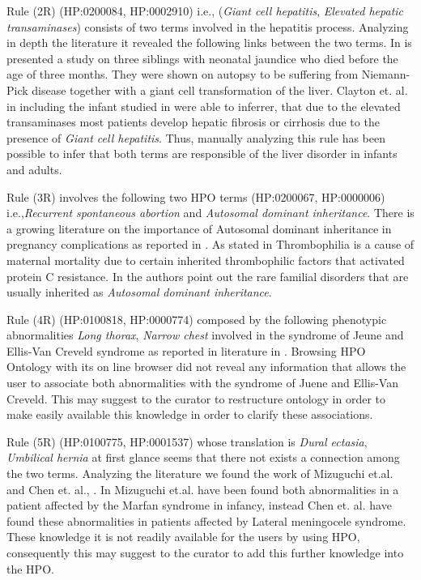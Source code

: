 \documentclass{article}
\theoremstyle{definition}
\begin{document}
Rule (2R) (HP:0200084, HP:0002910) i.e.,  (\textit{Giant cell hepatitis}, \textit{Elevated hepatic transaminases}) consists of two terms involved in the hepatitis process. Analyzing in depth the literature it revealed   the following links between the two terms. In \cite{APA:APA285} is presented a study on three siblings with neonatal jaundice who died before the age of three months. They were shown on autopsy to be suffering from Niemann-Pick disease together with a giant cell transformation of the liver. Clayton et. al. in \cite{ClaytonPaper} including the infant studied in \cite{Kase1985} were able to inferrer, that due to the elevated transaminases most patients develop hepatic fibrosis or cirrhosis due to the presence of \textit{Giant cell hepatitis}. Thus, manually analyzing this rule has been possible to infer that both terms are responsible of the liver disorder in infants and adults.

Rule (3R) involves the following two HPO terms (HP:0200067, HP:0000006) i.e.,\textit{Recurrent spontaneous abortion} and \textit{Autosomal dominant inheritance}. There is a growing literature on the importance of  Autosomal dominant inheritance in pregnancy complications as reported in \cite{byrne1994genetic}. As stated in \cite{Kutteh2006} Thrombophilia is a cause of maternal mortality due to certain inherited thrombophilic factors that activated protein C resistance. In \cite{coumans1999haemostatic} the authors point out the rare familial disorders that are usually inherited as \textit{Autosomal dominant inheritance}. 

Rule (4R) (HP:0100818, HP:0000774) composed by the following phenotypic abnormalities \textit{Long thorax}, \textit{Narrow chest} involved in the syndrome of Jeune and Ellis-Van Creveld syndrome as reported in literature in \cite{AJMG:AJMG1320210304, baujat2007ellis}. Browsing HPO Ontology with its on line browser did not reveal any information that allows the user to associate both abnormalities with the syndrome of Juene and Ellis-Van Creveld. This may suggest to the curator to restructure ontology in order to make easily available this knowledge in order to clarify these associations.

Rule (5R) (HP:0100775, HP:0001537) whose translation is \textit{Dural ectasia}, \textit{Umbilical hernia} at first glance seems that there not exists a connection among the two terms. Analyzing the literature we found the work of Mizuguchi et.al. \cite{mizuguchi2004heterozygous} and Chen et. al., \cite{chen2005lateral}. In Mizuguchi et.al. have been found both abnormalities in a patient affected by the Marfan syndrome in infancy, instead Chen et. al. have found  these abnormalities in patients affected by Lateral meningocele syndrome. These knowledge it is not readily available for the users by using HPO, consequently this may suggest to the curator to add this further knowledge into the HPO. 
\end{document}
